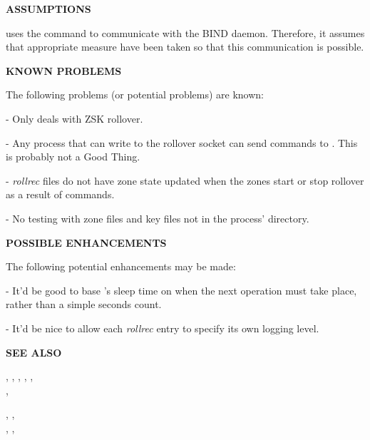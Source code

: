 {\bf ASSUMPTIONS}

 uses the  command to communicate with the BIND
 daemon.  Therefore, it assumes that appropriate measure have been
taken so that this communication is possible.

{\bf KNOWN PROBLEMS}

The following problems (or potential problems) are known:

\begin{description}

\item - Only deals with ZSK rollover.

\item - Any process that can write to the rollover socket can send commands to
.  This is probably not a Good Thing.

\item - {\it rollrec} files do not have zone state updated when the zones start
or stop rollover as a result of  commands.

\item - No testing with zone files and key files not in the process' directory.

\end{description}

{\bf POSSIBLE ENHANCEMENTS}

The following potential enhancements may be made:

\begin{description}

\item - It'd be good to base 's sleep time on when the next
operation must take place, rather than a simple seconds count.

\item - It'd be nice to allow each {\it rollrec} entry to specify its own
logging level.

\end{description}

{\bf SEE ALSO}

,
,
,
,
,	\\
,

,
, \\
,
, \\

